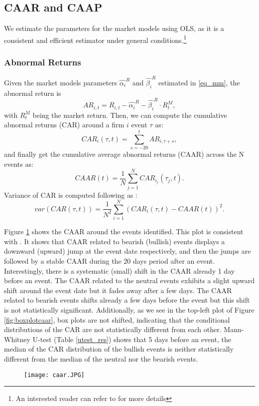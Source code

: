 \subsection{CAAR and CAAP}
We estimate the parameters for the market models using OLS, as it is a consistent and efficient estimator under general conditions.\footnote{An interested reader can refer to \citet{mackinlay1997event} for more details} 

\subsubsection{Abnormal Returns}
Given the market models parameters $\hat{\alpha_i}^R$ and $\hat{\beta_i}^R$ estimated in \eqref{eq_mm}, the abnormal return is
\[     AR_{i,t} = R_{i,t} - \hat{\alpha_i}^R - \hat{\beta_i}^R \cdot R_t^M,\]
with $R_t^M$ being the market return. Then, we can compute the cumulative abnormal returns (CAR) around a firm $i$ event $\tau$ as:
\[    CAR_i(\tau,t) = \sum_{s=- 20}^{t} AR_{i,\tau + s},\]
and finally get the cumulative average abnormal returns (CAAR) across the N events as:
\[     CAAR(t) = \dfrac{1}{N} \sum_{j=1}^N CAR_{i_j}(\tau_j,t).\]
Variance of CAR is computed following \citet{mackinlay1997event} as :
\[     var(CAR(\tau,t)) = \dfrac{1}{N^2} \sum_{i=1}^N (CAR_i(\tau,t) - CAAR(t))^2.\]

Figure \ref{fig:ES_CAAR_MM} shows the CAAR around the events identified. This plot is consistent with \citet{mackinlay1997event}. It shows that CAAR related to bearish (bullish) events displays a downward (upward) jump at the event date respectively, and then the jumps are followed by a stable CAAR during the 20 days period after an event. Interestingly, there is a systematic (small) shift in the CAAR already 1 day before an event. The CAAR related to the neutral events exhibits a slight upward shift around the event date but it fades away after a few days. The CAAR related to bearish events shifts already a few days before the event but this shift is not statistically significant. Additionally, as we see in the top-left plot of Figure \ref{fig:boxplotcaar}, box plots are not shifted, indicating that the conditional distributions of the CAR are not statistically different from each other. Mann-Whitney U-test (Table \ref{utest_res}) shows that 5 days before an event, the median of the CAR distribution of the bullish events is neither statistically different from the median of the neutral nor the bearish events.

\begin{figure}[h]
    \centering
    \texttt{[image: caar.JPG]}
    \label{fig:ES_CAAR_MM}
\end{figure}

